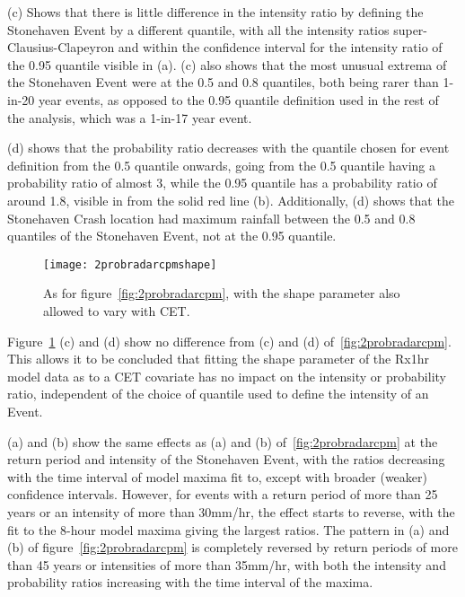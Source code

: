 (c) Shows that there is little difference in the intensity ratio by defining the Stonehaven Event by a different
    quantile, with all the intensity ratios super-Clausius-Clapeyron and within the confidence interval
    for the intensity ratio of the 0.95 quantile visible in (a).
(c) also shows that the most unusual extrema of the Stonehaven Event were at the 0.5 and 0.8 quantiles,
    both being rarer than 1-in-20 year events, as opposed to the 0.95 quantile definition used in the
    rest of the analysis, which was a 1-in-17 year event.

(d) shows that the probability ratio decreases with the quantile chosen for event definition from the 0.5 quantile onwards,
    going from the 0.5 quantile having a probability ratio of almost 3,
    while the 0.95 quantile has a probability ratio of around 1.8, visible in from the solid red line (b).
Additionally, (d) shows that the Stonehaven Crash location had maximum rainfall between the 0.5 and 0.8 quantiles of the Stonehaven Event,
    not at the 0.95 quantile.

\begin{figure}[H]
    \centering
    \texttt{[image: 2probradarcpmshape]}
    \caption{As for figure~\ref{fig:2probradarcpm},
    with the shape parameter also allowed to vary with CET.}
    \label{fig:2probradarcpmshape}
\end{figure}

Figure~\ref{fig:2probradarcpmshape} (c) and (d) show no difference from (c) and (d) of~\ref{fig:2probradarcpm}.
This allows it to be concluded that fitting the shape parameter of the Rx1hr model data as to a CET covariate has
    no impact on the intensity or probability ratio,
    independent of the choice of quantile used to define the intensity of an Event.

(a) and (b) show the same effects as (a) and (b) of~\ref{fig:2probradarcpm} at the return period and intensity
    of the Stonehaven Event,
    with the ratios decreasing with the time interval of model maxima fit to,
    except with broader (weaker) confidence intervals.
However,
    for events with a return period of more than 25 years or an intensity of more than 30mm/hr,
    the effect starts to reverse,
    with the fit to the 8-hour model maxima giving the largest ratios.
The pattern in (a) and (b) of figure~\ref{fig:2probradarcpm} is completely reversed by return periods of
    more than 45 years or intensities of more than 35mm/hr,
    with both the intensity and probability ratios increasing with the time interval of the maxima.

